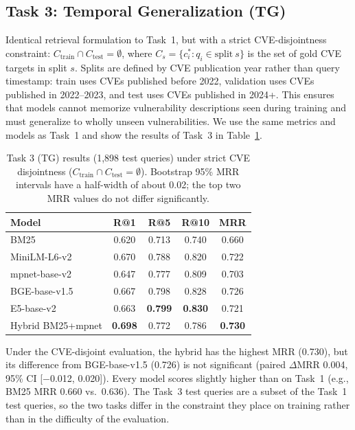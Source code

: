 \documentclass{article}
\begin{document}
\subsection{Task 3: Temporal Generalization (TG)}
\label{sec:task3}

Identical retrieval formulation to Task~1, but with a strict CVE-disjointness constraint: $C_{\text{train}} \cap C_{\text{test}} = \emptyset$, where $C_s = \{c^*_i : q_i \in \text{split}~s\}$ is the set of gold CVE targets in split $s$. Splits are defined by CVE publication year rather than query timestamp: train uses CVEs published before 2022, validation uses CVEs published in 2022--2023, and test uses CVEs published in 2024+. This ensures that models cannot memorize vulnerability descriptions seen during training and must generalize to wholly unseen vulnerabilities. We use the same metrics and models as Task~1 and show the results of Task~3 in Table~\ref{tab:task3-results}.

\begin{table}
\vspace{-4pt}
\centering
\small
\setlength{\tabcolsep}{3pt}
\caption{Task 3 (TG) results (1,898 test queries) under strict CVE disjointness
($C_{\text{train}} \cap C_{\text{test}} = \emptyset$). Bootstrap 95\% MRR intervals have a half-width of about 0.02; the top two MRR values do not differ significantly.}
\label{tab:task3-results}
\begin{tabular}{lcccc}
\toprule
\textbf{Model} & \textbf{R@1} & \textbf{R@5} & \textbf{R@10} & \textbf{MRR} \\
\midrule
BM25 & 0.620 & 0.713 & 0.740 & 0.660 \\
MiniLM-L6-v2 & 0.670 & 0.788 & 0.820 & 0.722 \\
mpnet-base-v2 & 0.647 & 0.777 & 0.809 & 0.703 \\
BGE-base-v1.5 & 0.667 & 0.798 & 0.828 & 0.726 \\
E5-base-v2 & 0.663 & \textbf{0.799} & \textbf{0.830} & 0.721 \\
\midrule
Hybrid BM25+mpnet & \textbf{0.698} & 0.772 & 0.786 & \textbf{0.730} \\
\bottomrule
\end{tabular}
\vspace{-4pt}
\end{table}

Under the CVE-disjoint evaluation, the hybrid has the highest MRR (0.730), but its difference from BGE-base-v1.5 (0.726) is not significant (paired $\Delta$MRR 0.004, 95\% CI [$-$0.012, 0.020]). Every model scores slightly higher than on Task~1 (e.g., BM25 MRR 0.660 vs.\ 0.636). The Task~3 test queries are a subset of the Task~1 test queries, so the two tasks differ in the constraint they place on training rather than in the difficulty of the evaluation.
\end{document}
